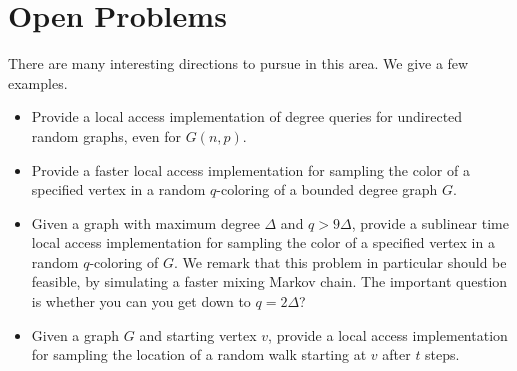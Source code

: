 \section{Open Problems}%
\label{sec:open_problems}
There are many interesting directions to pursue in this area. We give a few examples.
\begin{itemize}
    \item Provide a local access implementation of degree queries for undirected random graphs, even for $G(n,p)$.
    \item Provide a faster local access implementation for sampling the color of a specified vertex
          in a random $q$-coloring of a bounded degree graph $G$.
    \item Given a graph with maximum degree $\Delta$ and $q > 9\Delta$,
          provide a sublinear time local access implementation for sampling the color of a specified vertex in a random $q$-coloring of $G$.
          We remark that this problem in particular should be feasible, by simulating a faster mixing Markov chain.
          The important question is whether you can you get down to $q = 2\Delta$?
    \item Given a graph $G$ and starting vertex $v$,
          provide a local access implementation for sampling the location of a random walk starting at $v$ after $t$ steps.
\end{itemize}
